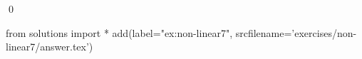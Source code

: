 
\begin{ex} 
  \label{ex:non-linear7}
  
  \qed
\end{ex} 
\begin{python0}
from solutions import *
add(label="ex:non-linear7",
    srcfilename='exercises/non-linear7/answer.tex') 
\end{python0}
